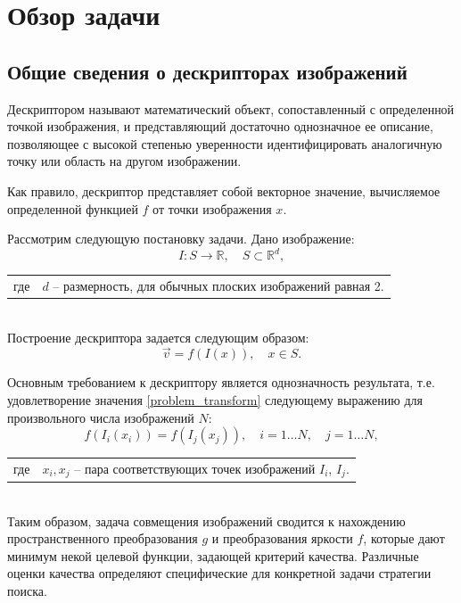 \section{Обзор задачи}
{
\subsection{Общие сведения о дескрипторах изображений}{
	Дескриптором называют математический объект, сопоставленный с определенной точкой изображения, и представляющий достаточно однозначное ее описание, позволяющее с высокой степенью уверенности идентифицировать аналогичную точку или область на другом изображении. 
	
	Как правило, дескриптор представляет собой векторное значение, вычисляемое определенной функцией $f$ от точки изображения $x$.
	
   Рассмотрим следующую постановку задачи. Дано изображение:
   \begin{equation}\label{problem_images}
   I : S \rightarrow \mathbb{R}, \quad S \subset \mathbb{R}^d,
   \end{equation}
   	\begin{tabular}{ rl }
   	 \quad \quad где 
   	& $d$ -- размерность, для обычных плоских изображений равная 2.
   	\end{tabular}\\
   
   Построение дескриптора задается следующим образом:
   \begin{equation}\label{problem_transform}
   \vec{v} = f(I(x)), \quad x \in S.
   \end{equation} 
 
   Основным требованием к дескриптору является однозначность результата, т.е. удовлетворение значения \eqref{problem_transform}  следующему выражению для произвольного числа изображений $N$:
   \begin{equation}\label{problem_constraints}
   f(I_i(x_i)) = f(I_j(x_j)), \quad i=1 \hdots N, \quad j=1 \hdots N,
   \end{equation} 
   \begin{tabular}{ rl }
   \quad \quad где 
   & $x_i, x_j$ -- пара соответствующих точек изображений $I_i$, $I_j$.
   \end{tabular}\\
   
   Таким образом, задача совмещения изображений сводится к нахождению пространственного преобразования $g$ и преобразования яркости $f$, которые дают минимум некой целевой функции, задающей критерий качества. Различные оценки качества определяют специфические для конкретной задачи стратегии поиска.   
   
}}
